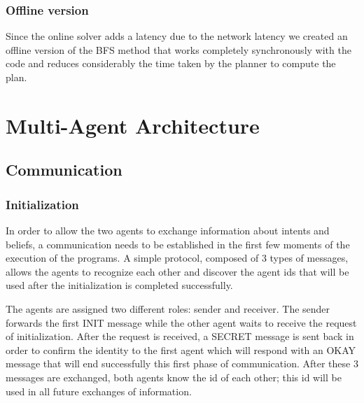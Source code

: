 \documentclass[a4paper, 11pt]{article}
\begin{document}
\subsubsection{Offline version}

Since the online solver adds a latency due to the network latency we created an offline version of the BFS method that works completely synchronously with the code and reduces considerably the time taken by the planner to compute the plan.


\section{Multi-Agent Architecture}

\subsection{Communication}
\subsubsection{Initialization}
In order to allow the two agents to exchange information about intents and beliefs, a communication needs to be established in the first few moments of the execution of the programs. A simple protocol, composed of 3 types of messages, allows the agents to recognize each other and discover the agent ids that will be used after the initialization is completed successfully.

The agents are assigned two different roles: sender and receiver. The sender forwards the first INIT message while the other agent waits to receive the request of initialization. After the request is received, a SECRET message is sent back in order to confirm the identity to the first agent which will respond with an OKAY message that will end successfully this first phase of communication. After these 3 messages are exchanged, both agents know the id of each other; this id will be used in all future exchanges of information.
\end{document}
